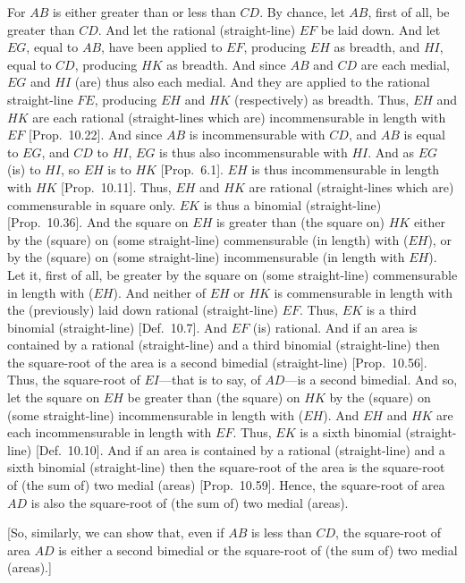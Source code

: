 \begin{Parallel}{}{}
{For $AB$ is either greater than or less than $CD$. By chance, let $AB$,
first of all,  be greater than $CD$. And let the rational (straight-line)
$EF$ be laid down. And let $EG$, equal to $AB$, have been applied
to $EF$, producing $EH$ as breadth, and $HI$, equal to $CD$, producing
$HK$ as breadth. And since $AB$ and $CD$ are each medial,
$EG$ and $HI$ (are) thus also each medial. And they are applied to
the rational straight-line $FE$, producing $EH$ and $HK$ (respectively) as breadth. Thus, $EH$ and $HK$ are  each rational (straight-lines which are) incommensurable in length with $EF$ [Prop.~10.22]. And since $AB$ is incommensurable
with $CD$, and $AB$ is equal to $EG$, and $CD$ to $HI$, $EG$
is thus also incommensurable with $HI$. And as $EG$ (is) to $HI$,
so $EH$ is to $HK$ [Prop.~6.1].  $EH$ is thus
incommensurable in length with $HK$ [Prop.~10.11]. Thus, $EH$ and $HK$ are rational
(straight-lines which are) commensurable in square only. $EK$
is thus a binomial (straight-line) [Prop.~10.36]. 
And the square on $EH$ is  greater than (the square on) $HK$
either by the (square) on (some straight-line) commensurable (in length) with ($EH$), or
by the (square) on (some straight-line) incommensurable (in length
with $EH$). Let it, first of all, be greater by the square on (some
straight-line) commensurable in length with ($EH$). And neither of
$EH$ or $HK$ is commensurable in length with the (previously)
laid down rational (straight-line) $EF$.  Thus, $EK$ is a third
binomial (straight-line) [Def.~10.7]. And $EF$
(is) rational. And if an area is contained by a rational (straight-line) and
a third binomial (straight-line)  then the square-root of the area
is a second bimedial  (straight-line) [Prop.~10.56]. Thus,
the square-root of $EI$---that is to say, of $AD$---is a second bimedial.
And so, let the square on $EH$ be greater than (the square) on $HK$
by the (square)  on (some straight-line) incommensurable in length
with ($EH$).  And $EH$ and $HK$
are each incommensurable
in length with $EF$. Thus, $EK$ is a sixth binomial (straight-line)
[Def.~10.10]. And if an area
is contained by
a rational (straight-line) and a sixth binomial (straight-line)  then the square-root of the area is the square-root of (the sum of) two medial (areas) 
[Prop.~10.59]. Hence, the
square-root of area $AD$ is also the square-root of (the sum of)
two medial (areas).

\mbox{[}So, similarly, we can show that, even if $AB$ is less than $CD$, the
square-root of area $AD$ is either a second bimedial or the square-root
of (the sum of) two medial (areas).]

}
\end{Parallel}

